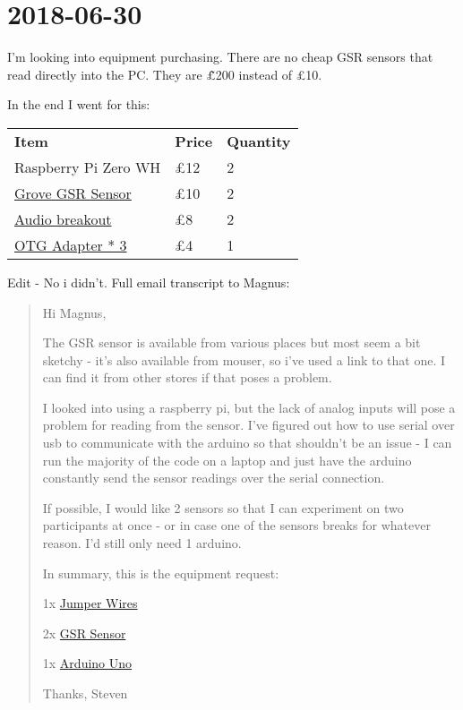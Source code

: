 \documentclass{article}
\begin{document}
	\section{2018-06-30}
	I'm looking into equipment purchasing. There are no cheap GSR sensors that read directly into the PC. They are \~\pounds200 instead of \pounds10.
	
	In the end I went for this:
	
	\begin{tabu}{XXX}
		\textbf{Item}&\textbf{Price}&\textbf{Quantity}\\
		Raspberry Pi Zero WH&\pounds12&2\\
		\hyperlink{https://brownsestablishment.co.uk/Page_i1675597}{Grove GSR Sensor}&\pounds10&2\\
		\hyperlink{https://www.amazon.co.uk/Adapter-Upgraded-VicTsing-Gold-Plated-Converter-Black-1080p-Audio/dp/B016I34422/}{Audio breakout}&\pounds8&2\\
		\hyperlink{https://www.amazon.co.uk/Rankie-Adapter-smartphone-tablets-connection-black/dp/B00YOX4JU6/}{OTG Adapter * 3}&\pounds4&1\\
	\end{tabu}

	Edit - No i didn't. Full email transcript to Magnus:
	
	\begin{quote}
	Hi Magnus,
	
	The GSR sensor is available from various places but most seem a bit sketchy - it's also available from mouser, so i've used a link to that one. I can find it from other stores if that poses a problem.
	
	I looked into using a raspberry pi, but the lack of analog inputs will pose a problem for reading from the sensor. I've figured out how to use serial over usb to communicate with the arduino so that shouldn't be an issue - I can run the majority of the code on a laptop and just have the arduino constantly send the sensor readings over the serial connection.
	
	If possible, I would like 2 sensors so that I can experiment on two participants at once - or in case one of the sensors breaks for whatever reason. I'd still only need 1 arduino.
	
	In summary, this is the equipment request:
	
	1x \hyperlink{https://www.mouser.co.uk/ProductDetail/Seeed-Studio/110990210?qs=sGAEpiMZZMvxSQPygxWTpU\%252buE\%2fLKoESoNY3o\%252bR6\%2feGg=}{Jumper Wires}
	
	2x \hyperlink{https://www.mouser.co.uk/ProductDetail/Seeed-Studio/101020052?qs=\%2fha2pyFaduglX1VjfWhqo3FSmM\%252bgGP5Nj9\%2f\%2fuNr2Jy3k41ptw01cgA\%3d\%3d}{GSR Sensor}
	
	1x \hyperlink{http://uk.farnell.com/arduino/a000073/arduino-uno-smd-dev-kit/dp/2285200}{Arduino Uno}
	
	Thanks,
	Steven
	\end{quote}
\end{document}
